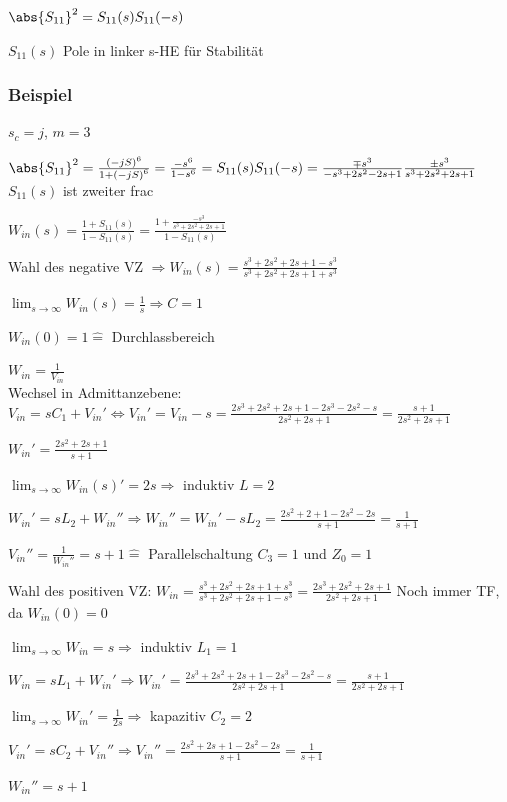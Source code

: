 $\abs{S_{11}}^2 = S_{11}(s) S_{11}(-s)$

$S_{11}(s)$ Pole in linker s-HE für Stabilität


\subsubsection{Beispiel}
$s_c = j$, $m = 3$

$\abs{S_{11}}^2 = \frac{\left(-jS\right)^6}{1 + \left(-jS\right)^6} = \frac{-s^6}{1 - s^6} = S_{11}(s) S_{11}(-s) 
= \frac{\mp s^3}{-s^3 + 2s^2 - 2s + 1} \frac{\pm s^3}{s^3 + 2s^2 + 2s + 1}$ $S_{11}(s)$ ist zweiter frac


$W_{in}(s) = \frac{1 + S_{11}(s)}{1 - S_{11}(s)} = \frac{1 + \frac{- s^3}{s^3 + 2s^2 + 2s + 1}}{1 - S_{11}(s)}$

Wahl des negative VZ $\Rightarrow W_{in}(s) = \frac{s^3 + 2s^2 + 2s + 1 - s^3}{s^3 + 2s^2 + 2s + 1 + s^3}$
\begin{pitemize}
    \item $\lim_{s\rightarrow\infty}\limits W_{in}(s) = \frac{1}{s} \Rightarrow C = 1$
\end{pitemize}

  

$W_{in}(0) = 1 \hat{=}$ Durchlassbereich


$W_{in} = \frac{1}{V_{in}}$\\
Wechsel in Admittanzebene: $V_{in} = sC_1 + V_{in}' \Leftrightarrow V_{in}' = V_{in} -s = \frac{2 s^3 + 2s^2 + 2s + 1 - 2s^3 - 2s^2 - s}{2s^2 + 2s + 1} = \frac{s + 1}{2s^2  + 2s + 1}$

$W_{in}' = \frac{2s^2 + 2s + 1}{s + 1}$

$\lim_{s \rightarrow \infty} W_{in}(s)' = 2s \Rightarrow$  induktiv $L = 2$



$W_{in}' = sL_2 + W_{in}'' \Rightarrow W_{in}'' = W_{in}' - sL_2 = \frac{2s^2 + 2 + 1 - 2s^2 - 2s}{s + 1} = \frac{1}{s + 1}$

$V_{in}'' = \frac{1}{W_{in}''} = s + 1 \hat{=} $ Parallelschaltung $C_3 = 1$ und $Z_0 = 1$


Wahl des positiven VZ: 
$W_{in} = \frac{s^3 + 2s^2 + 2s + 1 + s^3}{s^3 + 2s^2 + 2s + 1 - s^3} = \frac{2s^3 + 2s^2 + 2s + 1}{2s^2 + 2s + 1}$
Noch immer TF, da $W_{in}(0) = 0$


\begin{pitemize}
    \item $\lim_{s\rightarrow\infty} W_{in} = s \Rightarrow$ induktiv $L_1 = 1$
    \item $W_{in} = sL_1 + W_{in}' \Rightarrow W_{in}' = \frac{2s^3 + 2s^2 + 2s + 1 - 2s^3 - 2s^2 - s}{2s^2 + 2s + 1} = \frac{s + 1}{2s^2 + 2s + 1}$
    \item $\lim_{s\rightarrow\infty} W_{in}' = \frac{1}{2s} \Rightarrow$ kapazitiv $C_2 = 2$
    \item $V_{in}' = sC_2 + V_{in}'' \Rightarrow V_{in}'' = \frac{2s^2 + 2s + 1 - 2s^2 - 2s}{s + 1} = \frac{1}{s+1}$
    \item $W_{in}'' = s + 1$
    \item {}
\end{pitemize}



